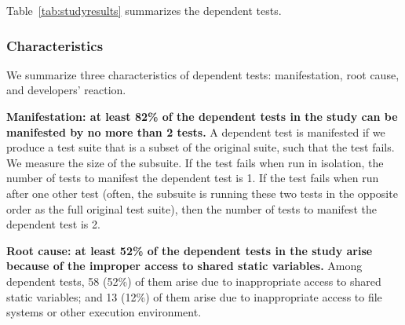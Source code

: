 

Table~\ref{tab:studyresults} summarizes the dependent tests.


\subsubsection{Characteristics}

We summarize three characteristics of dependent tests:
manifestation, root cause, and developers' reaction.

\vspace{1mm}
\noindent \textbf{{Manifestation: at least 82\% of the dependent
tests in the study can be manifested by no more than 2 tests.}}
A dependent test is manifested if we produce a test suite that is a 
subset of the original suite, such that the test fails.
We measure the size of the subsuite.
If the test fails when run in isolation, the number of tests to manifest
the dependent test is 1.
If the test fails when run after one other test (often, the subsuite is
running these two tests in the opposite order as the full original test
suite), then the number of tests to manifest the dependent test is 2.



\vspace{1mm}
\noindent \textbf{{Root cause: at least 52\% of the dependent tests
in the study arise because of the improper access to shared static
variables.}} Among \dtnum dependent tests, 58 (52\%) of them
arise due to inappropriate access to
shared static variables; and 13 (12\%) of them arise
due to inappropriate access to file systems or other
execution environment. 

